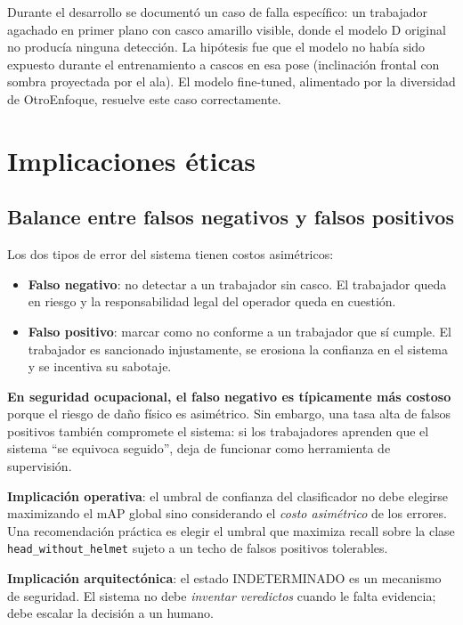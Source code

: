 \documentclass[11pt,a4paper]{article}
\begin{document}
Durante el desarrollo se documentó un caso de falla específico: un
trabajador agachado en primer plano con casco amarillo visible, donde
el modelo D original no producía ninguna detección. La hipótesis fue
que el modelo no había sido expuesto durante el entrenamiento a cascos
en esa pose (inclinación frontal con sombra proyectada por el ala). El
modelo fine-tuned, alimentado por la diversidad de OtroEnfoque, resuelve
este caso correctamente.

\section{Implicaciones éticas}

\subsection{Balance entre falsos negativos y falsos positivos}

Los dos tipos de error del sistema tienen costos asimétricos:

\begin{itemize}[leftmargin=*]
    \item \textbf{Falso negativo}: no detectar a un trabajador sin
    casco. El trabajador queda en riesgo y la responsabilidad legal del
    operador queda en cuestión.
    \item \textbf{Falso positivo}: marcar como no conforme a un
    trabajador que sí cumple. El trabajador es sancionado injustamente,
    se erosiona la confianza en el sistema y se incentiva su sabotaje.
\end{itemize}

\textbf{En seguridad ocupacional, el falso negativo es típicamente más
costoso} porque el riesgo de daño físico es asimétrico. Sin embargo,
una tasa alta de falsos positivos también compromete el sistema: si
los trabajadores aprenden que el sistema ``se equivoca seguido'', deja
de funcionar como herramienta de supervisión.

\textbf{Implicación operativa}: el umbral de confianza del clasificador
no debe elegirse maximizando el mAP global sino considerando el
\emph{costo asimétrico} de los errores. Una recomendación práctica es
elegir el umbral que maximiza recall sobre la clase
\texttt{head\_without\_helmet} sujeto a un techo de falsos positivos
tolerables.

\textbf{Implicación arquitectónica}: el estado INDETERMINADO es un
mecanismo de seguridad. El sistema no debe \emph{inventar veredictos}
cuando le falta evidencia; debe escalar la decisión a un humano.
\end{document}
